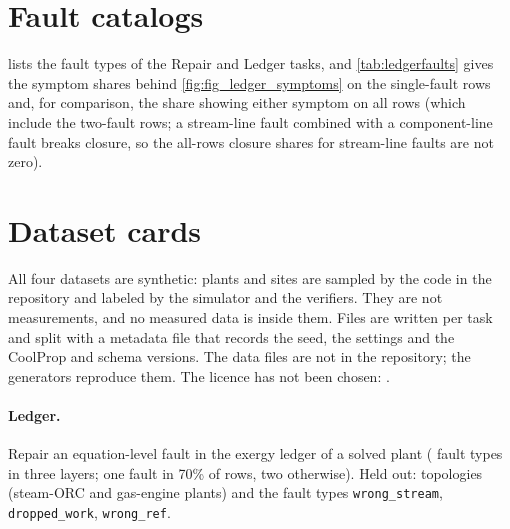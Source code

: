 

\section{Fault catalogs}\label{app:faults}

 lists the fault types of the Repair and Ledger tasks, and \cref{tab:ledgerfaults} gives the symptom shares behind \cref{fig:fig_ledger_symptoms} on the single-fault rows and, for comparison, the share showing either symptom on all rows (which include the  two-fault rows; a
stream-line fault combined with a component-line fault breaks closure, so the all-rows closure shares for stream-line faults are not zero).

\begin{table}[tbp]
\centering

\caption{Fault catalogs. Repair:  parameter-level types; Ledger repair:  equation-level types in three layers. The held-out Repair faults are sign flip and swapped ports.}
\label{tab:faults}
\end{table}

\begin{table}[tbp]
\centering

\caption{Symptom shares per ledger fault type (simulation,  generated rows, seed 0). Columns are the share of rows showing a closure residual, a negative exergy destruction or either, on single-fault rows
and on all rows. $^*$ marks a held-out fault type. Data: \texttt{assets/ledger\_symptoms.json}.}
\label{tab:ledgerfaults}
\end{table}

\section{Dataset cards}\label{app:datasets}

All four datasets are synthetic: plants and sites are sampled by the code in the repository and labeled by the simulator and the verifiers. They are not measurements, and no measured data is inside them. Files are written per task and split
with a metadata file that records the seed, the settings and the CoolProp and schema versions. The data files are not in the repository; the generators reproduce them. The licence has not been chosen: .

\paragraph{Ledger.} Repair an equation-level fault in the exergy ledger of a solved plant ( fault types in three layers; one fault in 70\% of rows, two otherwise). Held out: topologies (steam-ORC and gas-engine plants) and the fault types \texttt{wrong\_stream}, \texttt{dropped\_work}, \texttt{wrong\_ref}.


